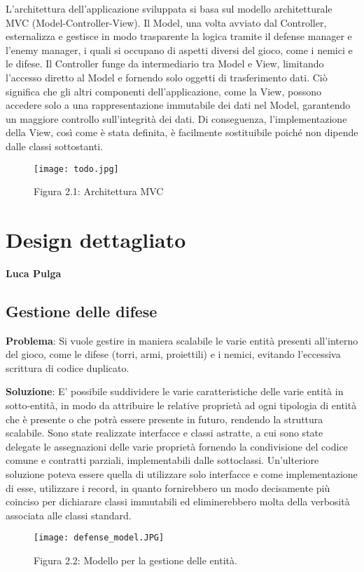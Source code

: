 \documentclass[a4paper,12pt]{report}
\begin{document}
L'architettura dell'applicazione sviluppata si basa sul modello architetturale MVC (Model-Controller-View). Il Model, una volta avviato dal Controller, esternalizza e gestisce in modo trasparente la logica tramite il defense manager e l'enemy manager, i quali si occupano di aspetti diversi del gioco, come i nemici e le difese. Il Controller funge da intermediario tra Model e View, limitando l'accesso diretto al Model e fornendo solo oggetti di trasferimento dati. Ciò significa che gli altri componenti dell'applicazione, come la View, possono accedere solo a una rappresentazione immutabile dei dati nel Model, garantendo un maggiore controllo sull'integrità dei dati. Di conseguenza, l'implementazione della View, così come è stata definita, è facilmente sostituibile poiché non dipende dalle classi sottostanti.
\begin{figure}
    \centering
    \texttt{[image: todo.jpg]}
    \caption{Figura 2.1: Architettura MVC}
    \label{fig:enter-label}
\end{figure}
\section{Design dettagliato}
\textbf{Luca Pulga}
\subsection{Gestione delle difese}

\textbf{Problema}:
Si vuole gestire in maniera scalabile le varie entità presenti all'interno del gioco, come le difese (torri, armi, proiettili) e i nemici, evitando l'eccessiva scrittura di codice duplicato.

\textbf{Soluzione}:
E' possibile suddividere le varie caratteristiche delle varie entità in sotto-entità, in modo da attribuire le relative proprietà ad ogni tipologia di entità che è presente
o che potrà essere presente in futuro, rendendo la struttura scalabile. Sono state realizzate interfacce e classi astratte, a cui sono state delegate le assegnazioni delle varie proprietà fornendo la condivisione del codice comune e contratti parziali, implementabili dalle sottoclassi.
Un'ulteriore soluzione poteva essere quella di utilizzare solo interfacce e come implementazione di esse, utilizzare i record, in quanto fornirebbero un modo decisamente più coinciso per dichiarare classi immutabili ed eliminerebbero molta della verbosità associata alle classi standard.

\begin{figure}[H]
    \centering
    \texttt{[image: defense\_model.JPG]}
    \caption{Figura 2.2: Modello per la gestione delle entità.}
    \label{fig:defense-model}
\end{figure}
\end{document}
